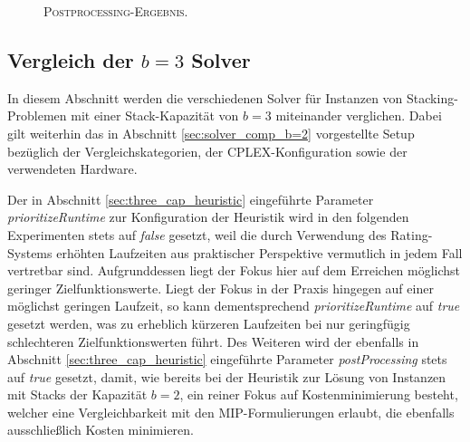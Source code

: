 \begin{figure}[H]
  \centering
    \caption{\textsc{Postprocessing-Ergebnis.}}
    \label{fig:valid_solution_post_processing}
\end{figure}

\subsection{Vergleich der $b = 3$ Solver}
\label{sec:solver_comp_b=3}

In diesem Abschnitt werden die verschiedenen Solver für Instanzen von Stacking-Problemen mit einer Stack-Kapazität
von $b = 3$ miteinander verglichen. Dabei gilt weiterhin das in Abschnitt \ref{sec:solver_comp_b=2} vorgestellte Setup
bezüglich der Vergleichskategorien, der \textsc{CPLEX}-Konfiguration sowie der verwendeten Hardware.

Der in Abschnitt \ref{sec:three_cap_heuristic} eingeführte Parameter \textit{prioritizeRuntime} zur Konfiguration der Heuristik
wird in den folgenden Experimenten stets auf \textit{false} gesetzt, weil die durch Verwendung des Rating-Systems erhöhten Laufzeiten
aus praktischer Perspektive vermutlich in jedem Fall vertretbar sind. Aufgrunddessen liegt der Fokus hier auf dem Erreichen
möglichst geringer Zielfunktionswerte. Liegt der Fokus in der Praxis hingegen auf einer möglichst geringen Laufzeit, so kann dementsprechend \textit{prioritizeRuntime} auf \textit{true} gesetzt werden, was zu erheblich kürzeren Laufzeiten bei nur geringfügig schlechteren Zielfunktionswerten führt.
Des Weiteren wird der ebenfalls in Abschnitt \ref{sec:three_cap_heuristic} eingeführte Parameter \textit{postProcessing}
stets auf \textit{true} gesetzt, damit, wie bereits bei der Heuristik zur Lösung von Instanzen mit Stacks der Kapazität $b = 2$,
ein reiner Fokus auf Kostenminimierung besteht, welcher eine Vergleichbarkeit mit den MIP-Formulierungen erlaubt, die ebenfalls
ausschließlich Kosten minimieren.

